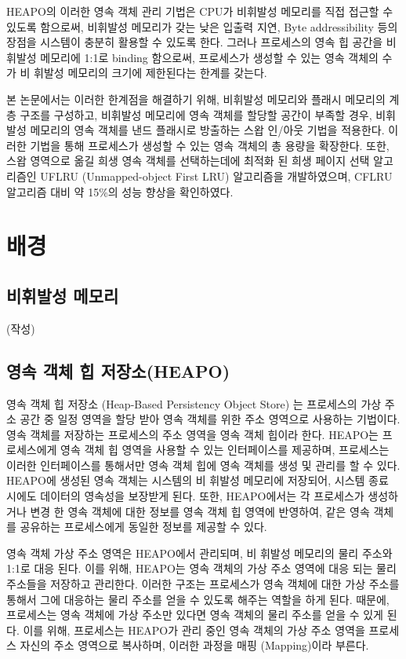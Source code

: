 \documentclass[letterpaper,twocolumn,10pt]{article}
\begin{document}
HEAPO의 이러한 영속 객체 관리 기법은 CPU가 비휘발성 메모리를 직접 접근할 수 있도록 함으로써, 비휘발성 메모리가 갖는 낮은 입출력 지연, Byte addressibility 등의 장점을 시스템이 충분히 활용할 수 있도록 한다. 그러나 프로세스의 영속 힙 공간을 비휘발성 메모리에 1:1로 binding 함으로써, 프로세스가 생성할 수 있는 영속 객체의 수가 비 휘발성 메모리의 크기에 제한된다는 한계를 갖는다.

본 논문에서는 이러한 한계점을 해결하기 위해, 비휘발성 메모리와 플래시 메모리의 계층 구조를 구성하고, 비휘발성 메모리에 영속 객체를 할당할 공간이 부족할 경우, 비휘발성 메모리의 영속 객체를 낸드 플래시로 방출하는 스왑 인/아웃 기법을 적용한다. 이러한 기법을 통해 프로세스가 생성할 수 있는 영속 객체의 총 용량을 확장한다. 또한, 스왑 영역으로 옮길 희생 영속 객체를 선택하는데에 최적화 된 희생 페이지 선택 알고리즘인 UFLRU (Unmapped-object First LRU) 알고리즘을 개발하였으며, CFLRU \cite{park2006cflru} 알고리즘 대비 약 15\%의 성능 향상을 확인하였다.

\section{배경}
\subsection{비휘발성 메모리}
(작성)
\subsection{영속 객체 힙 저장소(HEAPO)}
영속 객체 힙 저장소 (Heap-Based Persistency Object Store) \cite{hwang2015heapo}는 프로세스의 가상 주소 공간 중 일정 영역을 할당 받아 영속 객체를 위한 주소 영역으로 사용하는 기법이다. 영속 객체를 저장하는 프로세스의 주소 영역을 영속 객체 힙이라 한다. HEAPO는 프로세스에게 영속 객체 힙 영역을 사용할 수 있는 인터페이스를 제공하며, 프로세스는 이러한 인터페이스를 통해서만 영속 객체 힙에 영속 객체를 생성 및 관리를 할 수 있다. HEAPO에 생성된 영속 객체는 시스템의 비 휘발성 메모리에 저장되어, 시스템 종료 시에도 데이터의 영속성을 보장받게 된다. 또한, HEAPO에서는 각 프로세스가 생성하거나 변경 한 영속 객체에 대한 정보를 영속 객체 힙 영역에 반영하여, 같은 영속 객체를 공유하는 프로세스에게 동일한 정보를 제공할 수 있다. 

영속 객체 가상 주소 영역은 HEAPO에서 관리되며, 비 휘발성 메모리의 물리 주소와 1:1로 대응 된다. 이를 위해, HEAPO는 영속 객체의 가상 주소 영역에 대응 되는 물리 주소들을 저장하고 관리한다. 이러한 구조는 프로세스가 영속 객체에 대한 가상 주소를 통해서 그에 대응하는 물리 주소를 얻을 수 있도록 해주는 역할을 하게 된다. 때문에, 프로세스는 영속 객체에 가상 주소만 있다면 영속 객체의 물리 주소를 얻을 수 있게 된다. 이를 위해, 프로세스는 HEAPO가 관리 중인 영속 객체의 가상 주소 영역을 프로세스 자신의 주소 영역으로 복사하며, 이러한 과정을 매핑 (Mapping)이라 부른다. 
\end{document}
